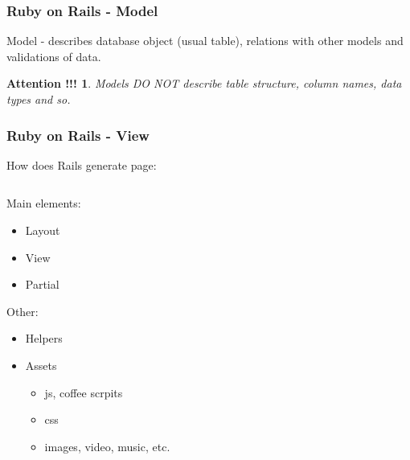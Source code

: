 \documentclass{beamer}
\theoremstyle{mystyle}
\newtheorem*{attention}{Attention !!!}
\begin{document}
\begin{frame}
  \frametitle{Ruby on Rails - Model}
  \begin{definition}
    Model - describes database object (usual table), relations with other
    models and validations of data.
  \end{definition}
  \begin{example}[user.rb]
    \modelexample
  \end{example}
  \begin{attention}
    \alert{Models DO NOT} describe table structure, column names, data types and so.
  \end{attention}
\end{frame}

\begin{frame}
  \frametitle{Ruby on Rails - View}
  How does Rails generate page:
  \begin{columns}
    \begin{column}{0.5\textwidth}
      Main elements:
      \begin{itemize}
        \item Layout
        \item View
        \item Partial 
      \end{itemize}
      Other:
      \begin{itemize}
        \item Helpers 
        \item Assets 
          \begin{itemize}
            \item js, coffee scrpits
            \item css
            \item images, video, music, etc.
          \end{itemize}
      \end{itemize}
    \end{column}
    

\end{columns}
\end{frame}
\end{document}
